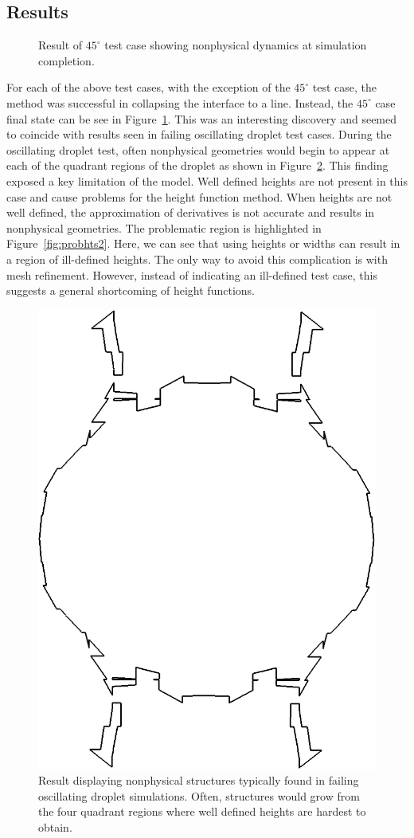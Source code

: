 \subsection{Results}
\begin{figure}[htbp]
	\centering
	\caption{Result of $45^{\circ}$ test case showing nonphysical dynamics at simulation completion.}
	\label{fig:45new}
\end{figure}
For each of the above test cases, with the exception of the $45^{\circ}$ test case, the method was successful in collapsing the interface to a line. Instead, the $45^{\circ}$ case final state can be see in Figure~\ref{fig:45new}.  This was an interesting discovery and seemed to coincide with results seen in failing oscillating droplet test cases. During the oscillating droplet test, often nonphysical geometries would begin to appear at each of the quadrant regions of the droplet as shown in Figure~\ref{fig:45s}. This finding exposed a key limitation of the model. Well defined heights are not present in this case and cause problems for the height function method. When heights are not well defined, the approximation of derivatives is not accurate and results in nonphysical geometries. The problematic region is highlighted in Figure~\ref{fig:probhts2}. Here, we can see that using heights or widths can result in a region of ill-defined heights. The only way to avoid this complication is with mesh refinement. However, instead of indicating an ill-defined test case, this suggests a general shortcoming of height functions.
\begin{figure}[htbp]
	\centering
	\includegraphics[width=0.4\linewidth]{figs/bad.png}
	\caption{Result displaying nonphysical structures typically found in failing oscillating droplet simulations. Often, structures would grow from the four quadrant regions where well defined heights are hardest to obtain.}
	\label{fig:45s}
\end{figure}
